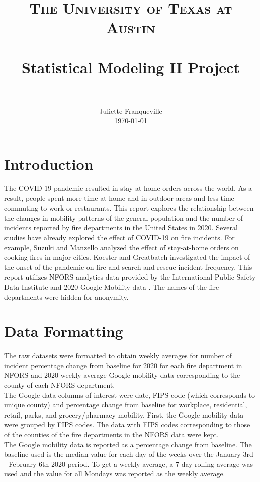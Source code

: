 \documentclass[paper=a4, fontsize=11pt]{scrartcl}
\title{
		\usefont{OT1}{bch}{b}{n}
		\normalfont \normalsize \textsc{The University of Texas at Austin} \\ [25pt]
		\horrule{0.5pt} \\[0.4cm]
		\huge Statistical Modeling II Project \\
		\horrule{2pt} \\[0.5cm]
}
\author{
		\normalfont 								\normalsize
        Juliette Franqueville\\[-3pt]		\normalsize
        \today
}
\date{}
\begin{document}
\maketitle
\newpage
\section{Introduction}

The COVID-19 pandemic resulted in stay-at-home orders across the world. As a result, people spent more time at home and in outdoor areas and less time commuting to work or restaurants. This report explores the relationship between the changes in mobility patterns of the general population and the number of incidents reported by fire departments in the United States in 2020. Several studies have already explored the effect of COVID-19 on fire incidents. For example, Suzuki and Manzello \cite{fire_paper} analyzed the effect of stay-at-home orders on cooking fires in major cities. Koester and Greatbatch \cite{koester2020comparing} investigated the impact of the onset of the pandemic on fire and search and rescue incident frequency. This report utilizes NFORS \cite{nfors} analytics data provided by the International Public Safety Data Institute and 2020 Google Mobility data \cite{google}. The names of the fire departments were hidden for anonymity. 

\section{Data Formatting}
The raw datasets were formatted to obtain weekly averages for number of incident percentage change from baseline for 2020 for each fire department in NFORS and 2020 weekly average Google mobility data corresponding to the county of each NFORS department.\\


The Google data columns of interest were date,  FIPS code (which corresponds to unique county) and percentage change from baseline for workplace, residential, retail, parks, and grocery/pharmacy mobility. First, the Google mobility data were grouped by FIPS codes.  The data with FIPS codes corresponding to those of the counties of the fire departments in the NFORS data were kept.\\



The Google mobility data is reported as a percentage change from baseline. The baseline used is the median value for each day of the weeks over the January 3rd - February 6th 2020 period. To get a weekly average, a 7-day rolling average was used and the value for all Mondays was reported as the weekly average. \\
\end{document}
